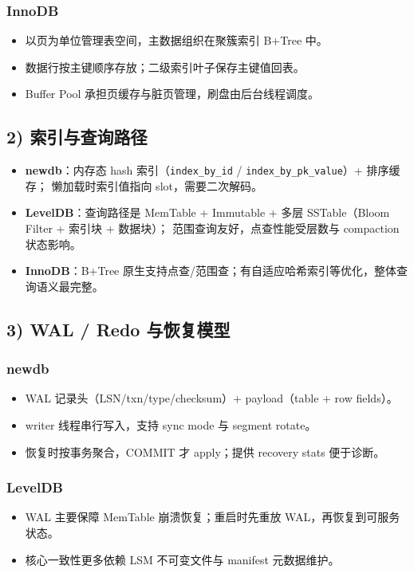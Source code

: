 \subsubsection{InnoDB}
\begin{itemize}
  \item 以页为单位管理表空间，主数据组织在聚簇索引 B+Tree 中。
  \item 数据行按主键顺序存放；二级索引叶子保存主键值回表。
  \item Buffer Pool 承担页缓存与脏页管理，刷盘由后台线程调度。
\end{itemize}

\subsection{2) 索引与查询路径}

\begin{itemize}
  \item \textbf{newdb}：内存态 hash 索引（\texttt{index\_by\_id} / \texttt{index\_by\_pk\_value}）+ 排序缓存；
    懒加载时索引值指向 slot，需要二次解码。
  \item \textbf{LevelDB}：查询路径是 MemTable + Immutable + 多层 SSTable（Bloom Filter + 索引块 + 数据块）；
    范围查询友好，点查性能受层数与 compaction 状态影响。
  \item \textbf{InnoDB}：B+Tree 原生支持点查/范围查；有自适应哈希索引等优化，整体查询语义最完整。
\end{itemize}

\subsection{3) WAL / Redo 与恢复模型}

\subsubsection{newdb}
\begin{itemize}
  \item WAL 记录头（LSN/txn/type/checksum）+ payload（table + row fields）。
  \item writer 线程串行写入，支持 sync mode 与 segment rotate。
  \item 恢复时按事务聚合，COMMIT 才 apply；提供 recovery stats 便于诊断。
\end{itemize}

\subsubsection{LevelDB}
\begin{itemize}
  \item WAL 主要保障 MemTable 崩溃恢复；重启时先重放 WAL，再恢复到可服务状态。
  \item 核心一致性更多依赖 LSM 不可变文件与 manifest 元数据维护。
\end{itemize}

